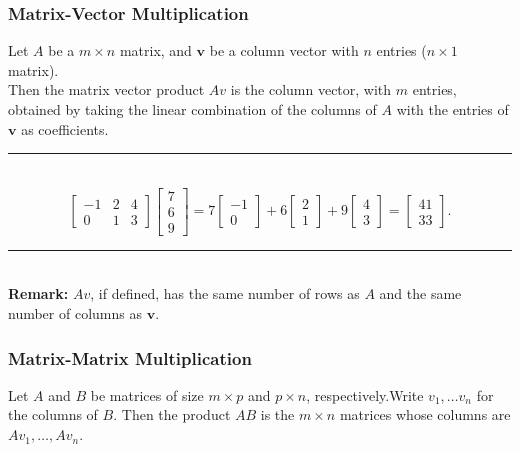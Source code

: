 \documentclass[a4paper, 9pt]{extarticle}
\begin{document}
\subsubsection*{Matrix-Vector Multiplication}
\begin{definitionbox}{}{}
  Let $A$ be a $m \times n$ matrix, and $\textbf{v}$ be a column vector with $n$ entries ($n \times 1$ matrix). \\[2ex]
  Then the matrix vector product $Av$ is the column vector, with $m$ entries, obtained by taking the linear combination of the columns of $A$ with the entries of $\textbf{v}$ as coefficients.
  \\ \rule{\textwidth}{1px} \\
  $$
    \begin{bmatrix}
      -1 & 2 & 4 \\
      0  & 1 & 3
    \end{bmatrix}
    \begin{bmatrix}
      7 \\
      6 \\
      9
    \end{bmatrix}
    =
    7 \begin{bmatrix}
      -1 \\
      0
    \end{bmatrix}
    + 6 \begin{bmatrix}
      2 \\
      1
    \end{bmatrix}
    + 9 \begin{bmatrix}
      4 \\
      3
    \end{bmatrix}
    =
    \begin{bmatrix}
      41 \\
      33
    \end{bmatrix}.
  $$
  \rule{\textwidth}{1px} \\[2ex]
  \textbf{Remark:} $Av$, if defined, has the same number of rows as $A$ and the same number of columns as $\textbf{v}$.
\end{definitionbox}
\subsubsection*{Matrix-Matrix Multiplication}
\begin{definitionbox}{}{}
  Let $A$ and $B$ be matrices of size $m \times p$ and $p \times n$, respectively.Write $v_1, \ldots v_n$ for the columns of $B$. Then the product $AB$ is the $m \times n$ matrices whose columns are $Av_1 , \ldots, Av_n$.
\end{definitionbox}
\end{document}
